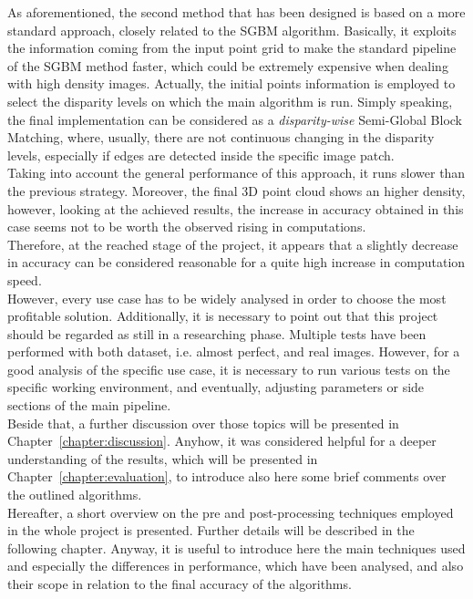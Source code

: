 As aforementioned, the second method that has been designed is based on a more standard approach, closely related to the SGBM algorithm. 
Basically, it exploits the information coming from the input point grid to make the standard pipeline of the SGBM method faster, which could be extremely expensive when dealing with high density images.
Actually, the initial points information is employed to select the disparity levels on which the main algorithm is run. 
Simply speaking, the final implementation can be considered as a \textit{disparity-wise} Semi-Global Block Matching, where, usually, there are not continuous changing in the disparity levels, especially if edges are detected inside the specific image patch.\\
Taking into account the general performance of this approach, it runs slower than the previous strategy. 
Moreover, the final 3D point cloud shows an higher density, however, looking at the achieved results, the increase in accuracy obtained in this case seems not to be worth the observed rising in computations. \\
Therefore, at the reached stage of the project, it appears that a slightly decrease in accuracy can be considered reasonable for a quite high increase in computation speed. \\
However, every use case has to be widely analysed in order to choose the most profitable solution.
Additionally, it is necessary to point out that this project should be regarded as still in a researching phase. 
Multiple tests have been performed with both dataset, i.e. almost perfect, and real images. 
However, for a good analysis of the specific use case, it is necessary to run various tests on the specific working environment, and eventually, adjusting parameters or side sections of the main pipeline.\\
Beside that, a further discussion over those topics will be presented in Chapter~\ref{chapter:discussion}. 
Anyhow, it was considered helpful for a deeper understanding of the results, which will be presented in Chapter~\ref{chapter:evaluation}, to introduce also here some brief comments over the outlined algorithms.\\
Hereafter, a short overview on the pre and post-processing techniques employed in the whole project is presented. 
Further details will be described in the following chapter. 
Anyway, it is useful to introduce here the main techniques used and especially the differences in performance, which have been analysed, and also their scope in relation to the final accuracy of the algorithms.

